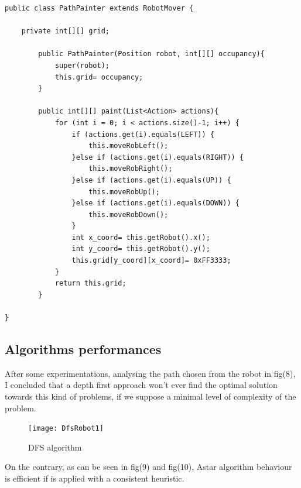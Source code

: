 \documentclass{article}
\begin{document}
							\begin{lstlisting}[caption= Path Painter, label=painter]
	public class PathPainter extends RobotMover {
		
	private int[][] grid;

	    public PathPainter(Position robot, int[][] occupancy){
	    	super(robot);
	    	this.grid= occupancy;
	    }

	    public int[][] paint(List<Action> actions){
			for (int i = 0; i < actions.size()-1; i++) {
        		if (actions.get(i).equals(LEFT)) {
        			this.moveRobLeft();
        		}else if (actions.get(i).equals(RIGHT)) {
        			this.moveRobRight();
        		}else if (actions.get(i).equals(UP)) {
        			this.moveRobUp();
        		}else if (actions.get(i).equals(DOWN)) {
        			this.moveRobDown();
        		}
        		int x_coord= this.getRobot().x();
        		int y_coord= this.getRobot().y();
        		this.grid[y_coord][x_coord]= 0xFF3333;
            }
        	return this.grid;
	    }

}
				\end{lstlisting}
				
				
				
				\subsection{Algorithms performances}
				
				After some experimentations, analysing the path chosen from the robot in fig(8), I concluded that a depth first approach won't ever find the optimal solution towards this kind of problems, if we suppose a minimal level of complexity of the problem.
		\begin{figure}[h]		
\centering
\texttt{[image: DfsRobot1]}
\caption{DFS algorithm}
\label{fig:8}
\end{figure}
				On the contrary, as can be seen in fig(9) and fig(10), Astar algorithm behaviour is efficient if is applied with a consistent heuristic.\\
\end{document}

